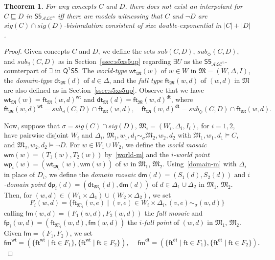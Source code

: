 \documentclass[10pt,a4paper]{amsart}
\theoremstyle{plain}
\newtheorem{thm}{Theorem}[section]
\theoremstyle{definition}
\newcommand{\nz}[1]{\textcolor{blue}{\bf!}%
	\marginpar[\parbox{15mm}{\raggedleft\scriptsize\textcolor{blue}{#1}}]%
	{\parbox{15mm}{\raggedright\scriptsize\textcolor{blue}{#1}}}}
\newcommand{\sub}{\textit{sub}}
\newcommand{\sig}{\mathit{sig}}
\newcommand{\FOMS}{\ensuremath{\mathsf{Q^1S5}}}
\newcommand{\ALCS}{\ensuremath{\mathsf{S5}_{\mathcal{ALC}^u}}}
\newcommand{\wt}{\mathsf{wt}}
\newcommand{\dt}{\mathsf{dt}}
\newcommand{\ft}{\mathsf{ft}}
\newcommand{\wm}{\mathsf{wm}}
\newcommand{\dm}{\mathsf{dm}}
\newcommand{\iwp}{\mathsf{wp}_i}
\newcommand{\idp}{\mathsf{dp}_i}
\newcommand{\pet}{\ft}
\newcommand{\pam}{\mathsf{fm}}
\newcommand{\ipp}{\mathsf{fp}_i}
\newcommand{\ALCIOS}{\ensuremath{\mathsf{S5}_{\mathcal{ALC}^u}}}
\begin{document}
\begin{thm}\label{th:sizeboundALC}
	For any concepts $C$ and $D$, there does not exist an interpolant for $C \sqsubseteq D$ in $\ALCIOS$ iff there are  models witnessing that $C$ and $\neg D$ are $\sig(C)\cap \sig(D)$-bisimulation consistent of size double-exponential in $|C|+|D|$. 
\end{thm}
%
\begin{proof}
Given concepts $C$ and $D$, we define the sets $\sub(C,D)$, $\sub_{\Diamond}(C,D)$, and $\sub_{\exists}(C,D)$ as in Section~\ref{ssec:s5xs5up} regarding $\exists U$ as the $\ALCS$-counterpart of $\exists$ in $\FOMS$. 
%
The \emph{world-type} $\wt_{\mathfrak{M}}(w)$ of $w \in W$ in $\mathfrak{M} = (W,\Delta,I)$, the  \emph{domain-type} $\dt_{\mathfrak{M}}(d)$ of $d \in \Delta$, and the \emph{full type} $\pet_{\mathfrak{M}}(w,d)$ of $(w,d)$ in $\mathfrak{M}$ are also defined as in Section~\ref{ssec:s5xs5up}. 
%
Observe that we have $\wt_{\mathfrak{M}}(w) = \pet_{\mathfrak{M}}(w,d)^{\wt}$ and $\dt_{\mathfrak{M}}(d) = \pet_{\mathfrak{M}}(w,d)^{\dt}$, where
%
$$
\pet_{\mathfrak{M}}(w,d)^{\wt}= \sub_{\exists}(C,D) \cap \pet_{\mathfrak{M}}(w,d),\quad 
\pet_{\mathfrak{M}}(w,d)^{\dt} = \sub_{\Diamond}(C,D) \cap \pet_{\mathfrak{M}}(w,d). 
$$

Now, suppose that $\sigma = \sig(C) \cap \sig(D)$, $\mathfrak{M}_{i}= (W_{i},\Delta_{i},I_{i})$, for $i = 1,2$, have pairwise disjoint $W_i$ and $\Delta_i$, $\mathfrak{M}_{1},w_{1},d_{1} \sim_{\sigma} \mathfrak{M}_{2},w_{2},d_{2}$  with $\mathfrak{M}_{1},w_{1},d_1 \models C$, and $\mathfrak{M}_{2},w_{2}, d_2 \models\neg D$. 
%
For $w\in W_{1}\cup W_{2}$, we  define the \emph{world mosaic} $\wm(w) = (T_{1}(w),T_{2}(w))$ by~\eqref{world-m} and the \emph{$i$-world point} $\iwp(w) = (\wt_{\mathfrak{M}_{i}}(w), \wm(w))$ of $w$ in $\mathfrak{M}_{1}$, $\mathfrak{M}_{2}$. Using~\eqref{domain-m} with $\Delta_i$ in place of $D_i$, we define the \emph{domain mosaic} $\dm(d)=(S_{1}(d),S_{2}(d))$ and  \emph{$i$-domain point} $\idp(d) = (\dt_{\mathfrak{M}_{i}}(d),\dm(d))$ of $d \in \Delta_1 \cup \Delta_2$ in $\mathfrak{M}_{1}$, $\mathfrak{M}_{2}$.
%
Then, for $(w,d) \in (W_{1} \times \Delta_{1}) \cup (W_{2} \times \Delta_{2})$, we set
%
$$
F_{i}(w,d) =\{ \pet_{\mathfrak{M}_{i}}(v,e) \mid (v,e)\in W_{i}\times \Delta_{i}, (v,e) \sim_{\sigma} (w,d)\}
$$
%
calling $\pam(w,d)=(F_{1}(w,d),F_{2}(w,d))$ the \emph{full mosaic} and $\ipp(w,d) = (\pet_{\mathfrak{M}_{i}}(w,d),\pam(w,d))$ the \emph{$i$-full point} of $(w,d)$
in $\mathfrak{M}_{1}$, $\mathfrak{M}_{2}$. 
%
Given $\pam=(F_{1},F_{2})$, we set
%
$$
\pam^{\wt} = (\{ \pet^{\wt} \mid \pet\in F_{1}\},\{ \pet^{\wt} \mid \pet\in F_{2}\}),\ \quad 
\pam^{\dt} = (\{ \pet^{\dt} \mid \pet\in F_{1}\},\{ \pet^{\dt} \mid \pet\in F_{2}\}).
$$
%


\end{proof}
\end{document}
